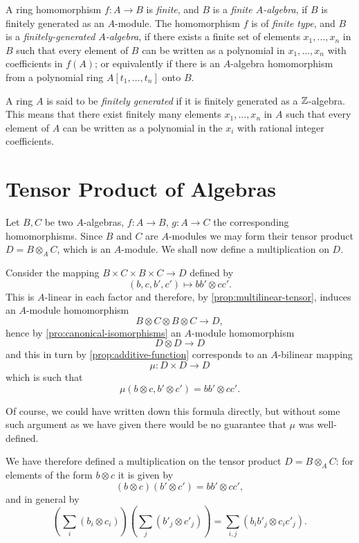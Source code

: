 A ring homomorphism $f \colon A \to B$ is \emph{finite}, and $B$ is a \emph{finite $A$-algebra}, if $B$ is finitely generated as an $A$-module. The homomorphism $f$ is of \emph{finite type}, and $B$ is a \emph{finitely-generated $A$-algebra}, if there exists a finite set of elements $x_1, \ldots, x_n$ in $B$ such that every element of $B$ can be written as a polynomial in $x_1, \ldots, x_n$ with coefficients in $f(A)$; or equivalently if there is an $A$-algebra homomorphism from a polynomial ring $A[t_1, \ldots, t_n]$ onto $B$.

A ring $A$ is said to be \emph{finitely generated} if it is finitely generated as a $\mathbb{Z}$-algebra. This means that there exist finitely many elements $x_1, \ldots, x_n$ in $A$ such that every element of $A$ can be written as a polynomial in the $x_i$ with rational integer coefficients.

\section*{Tensor Product of Algebras}

Let $B, C$ be two $A$-algebras, $f \colon A \to B$, $g \colon A \to C$ the corresponding homomorphisms. Since $B$ and $C$ are $A$-modules we may form their tensor product $D = B \otimes_A C$, which is an $A$-module. We shall now define a multiplication on $D$.

Consider the mapping $B \times C \times B \times C \to D$ defined by
\[
    (b, c, b', c') \mapsto bb' \otimes cc'.
\]
This is $A$-linear in each factor and therefore, by \eqref{prop:multilinear-tensor}, induces an $A$-module homomorphism
\[
    B \otimes C \otimes B \otimes C \to D,
\]
hence by \eqref{pro:canonical-isomorphisms} an $A$-module homomorphism
\[
    D \otimes D \to D
\]
and this in turn by \eqref{prop:additive-function} corresponds to an $A$-bilinear mapping
\[
\mu : D \times D \to D
\]
which is such that
\[
\mu(b \otimes c, b' \otimes c') = bb' \otimes cc'.
\]

Of course, we could have written down this formula directly, but without some such argument as we have given there would be no guarantee that $\mu$ was well-defined.

We have therefore defined a multiplication on the tensor product $D = B \otimes_A C$: for elements of the form $b \otimes c$ it is given by
\[
(b \otimes c)(b' \otimes c') = bb' \otimes cc',
\]
and in general by
\[
\left(\sum_i (b_i \otimes c_i)\right)\left(\sum_j (b'_j \otimes c'_j)\right) = \sum_{i,j} (b_i b'_j \otimes c_i c'_j).
\]

